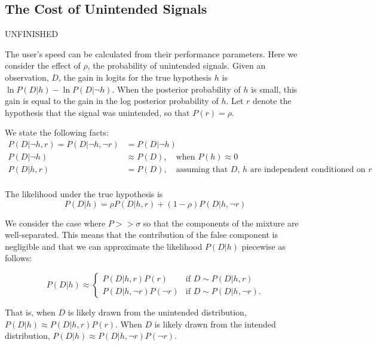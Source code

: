 \subsection{The Cost of Unintended Signals}
UNFINISHED


The user's speed can be calculated from their performance parameters.
Here we consider the effect of $\rho$, the probability of
unintended signals.
Given an observation, $D$, the gain in logits for the true hypothesis
$h$ is $\ln P(D | h) - \ln P(D | \neg h)$. When the posterior probability of
$h$ is small, this gain is equal to the gain in the log posterior probability
of $h$.
Let $r$ denote the hypothesis that the signal was unintended, so that
$P(r) = \rho$. 

We state the following facts:
\begin{align*}
P(D | \neg h, r) = P(D | \neg h, \neg r) &= P(D | \neg h) \\
P(D | \neg h) &\approx P(D), \quad \text{when } P(h) \approx 0 \\
P(D | h, r) &= P(D),  \quad \text{assuming that $D$, $h$ are independent conditioned on $r$} \\
\end{align*}

The likelihood under the true hypothesis is
$$P(D | h) = \rho P(D | h, r) + (1 - \rho) P(D | h, \neg r)$$

We consider the case where $P > > \sigma$
so that the components of the mixture are well-separated.
This means that the contribution of the false component is negligible
and that we can approximate the likelihood $P(D|h)$ piecewise as follows:

\[
P(D|h) \approx 
\begin{cases}
P(D | h, r) P(r) & \text{if } D \sim P(D|h, r) \\
P(D | h, \neg r)P(\neg r) & \text{if } D \sim P(D|h, \neg r).
\end{cases}
\]

That is, when $D$ is likely drawn from the unintended distribution, $P(D|h) \approx P(D|h, r) P(r)$. When $D$ is likely drawn from the intended distribution, $P(D|h) \approx P(D|h, \neg r)P(\neg r)$.




